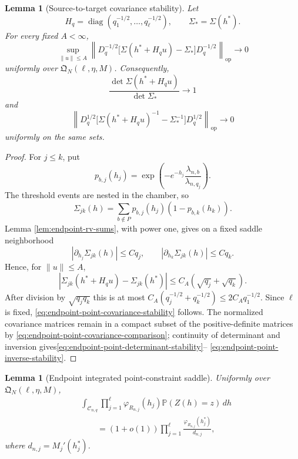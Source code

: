 \documentclass[11pt]{article}
\newtheorem{lemma}[theorem]{Lemma}
\theoremstyle{remark}
\newcommand{\Pp}{\mathbb P}
\newcommand{\diag}{\operatorname{diag}}
\newcommand{\dd}{\,d}
\begin{document}
\begin{lemma}[Source-to-target covariance stability]
\label{lem:endpoint-point-covariance-stability}
Let
\[
        H_q=\diag(q_1^{-1/2},\ldots,q_\ell^{-1/2}),
        \qquad \Sigma_*=\Sigma(h^*).
\]
For every fixed $A<\infty$,
\[
\sup_{\|u\|\le A}
\left\|
D_q^{-1/2}
\bigl[\Sigma(h^*+H_qu)-\Sigma_*\bigr]
D_q^{-1/2}
\right\|_{\mathrm{op}}\longrightarrow0
\tag{10.27}\label{eq:endpoint-point-covariance-stability}
\]
uniformly over $\mathfrak Q_N(\ell,\eta,M)$.  Consequently,
\[
        \frac{\det\Sigma(h^*+H_qu)}{\det\Sigma_*}\longrightarrow1
\tag{10.28}\label{eq:endpoint-point-determinant-stability}
\]
and
\[
\left\|
D_q^{1/2}
\bigl[\Sigma(h^*+H_qu)^{-1}-\Sigma_*^{-1}\bigr]
D_q^{1/2}
\right\|_{\mathrm{op}}\longrightarrow0
\tag{10.29}\label{eq:endpoint-point-inverse-stability}
\]
uniformly on the same sets.
\end{lemma}

\begin{proof}
For $j\le k$, put
\[
        p_{b,j}(h_j)=
        \exp\left(-e^{-h_j}
        \frac{\lambda_{n,b}}{\lambda_{n,q_j}}\right).
\]
The threshold events are nested in the chamber, so
\[
        \Sigma_{jk}(h)
        =\sum_{b\notin P}p_{b,j}(h_j)(1-p_{b,k}(h_k)).
\tag{10.30}\label{eq:endpoint-point-covariance-entry}
\]
Lemma \ref{lem:endpoint-rv-sums}, with power one, gives on a fixed saddle
neighborhood
\[
        |\partial_{h_j}\Sigma_{jk}(h)|\le Cq_j,
        \qquad
        |\partial_{h_k}\Sigma_{jk}(h)|\le Cq_k.
\]
Hence, for $\|u\|\le A$,
\[
        |\Sigma_{jk}(h^*+H_qu)-\Sigma_{jk}(h^*)|
        \le C_A(\sqrt{q_j}+\sqrt{q_k}).
\]
After division by $\sqrt{q_jq_k}$ this is at most
$C_A(q_j^{-1/2}+q_k^{-1/2})\le2C_Aq_1^{-1/2}$.  Since $\ell$ is fixed,
\eqref{eq:endpoint-point-covariance-stability} follows.  The normalized
covariance matrices remain in a compact subset of the positive-definite
matrices by \eqref{eq:endpoint-point-covariance-comparison}; continuity of
determinant and inversion gives\eqref{eq:endpoint-point-determinant-stability}--
\eqref{eq:endpoint-point-inverse-stability}.
\end{proof}

\begin{lemma}[Endpoint integrated point-constraint saddle]
\label{lem:endpoint-general-integrated-saddle}
Uniformly over $\mathfrak Q_N(\ell,\eta,M)$,
\[
\begin{aligned}
&\int_{\mathscr C_{n,q}}
\prod_{j=1}^\ell\varphi_{R_{n,j}}(h_j)
\Pp(Z(h)=z)\dd h\\
&\qquad=(1+o(1))
\prod_{j=1}^\ell
\frac{\varphi_{R_{n,j}}(h_j^*)}{d_{n,j}},
\end{aligned}
\tag{10.31}\label{eq:endpoint-point-integrated-saddle}
\]
where $d_{n,j}=M_j'(h_j^*)$.
\end{lemma}
\end{document}
